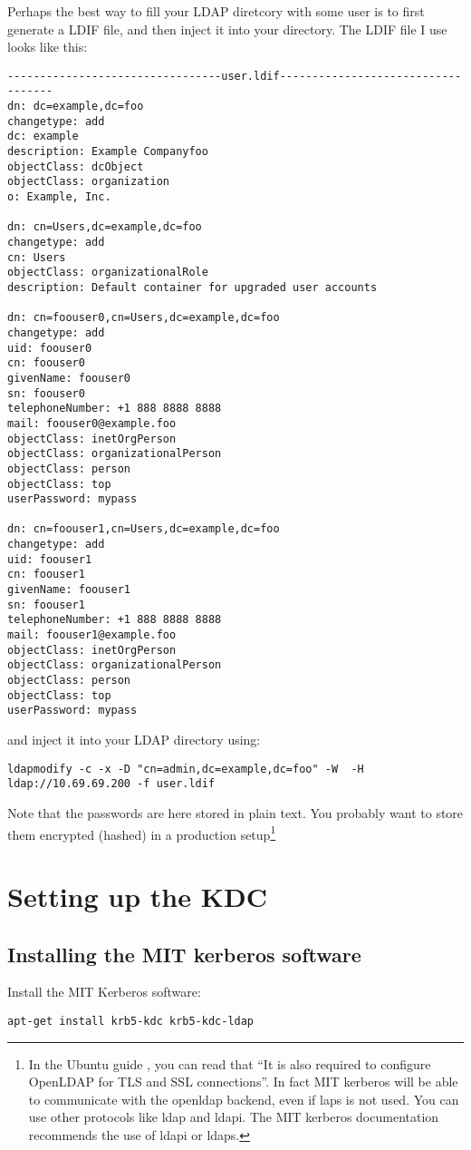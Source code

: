 \documentclass[12pt,a4]{article}
\begin{document}
Perhaps the best way to fill your LDAP diretcory with some user is to first generate a LDIF file, and then inject it into your directory.
The LDIF file I use looks like this:

\begin{verbatim}
---------------------------------user.ldif-----------------------------------
dn: dc=example,dc=foo
changetype: add
dc: example
description: Example Companyfoo
objectClass: dcObject
objectClass: organization
o: Example, Inc.

dn: cn=Users,dc=example,dc=foo
changetype: add
cn: Users
objectClass: organizationalRole
description: Default container for upgraded user accounts

dn: cn=foouser0,cn=Users,dc=example,dc=foo
changetype: add
uid: foouser0
cn: foouser0
givenName: foouser0
sn: foouser0
telephoneNumber: +1 888 8888 8888
mail: foouser0@example.foo
objectClass: inetOrgPerson
objectClass: organizationalPerson
objectClass: person
objectClass: top
userPassword: mypass

dn: cn=foouser1,cn=Users,dc=example,dc=foo
changetype: add
uid: foouser1
cn: foouser1
givenName: foouser1
sn: foouser1
telephoneNumber: +1 888 8888 8888
mail: foouser1@example.foo
objectClass: inetOrgPerson
objectClass: organizationalPerson
objectClass: person
objectClass: top
userPassword: mypass
\end{verbatim}

and inject it into your LDAP directory using:

\begin{verbatim}
ldapmodify -c -x -D "cn=admin,dc=example,dc=foo" -W  -H ldap://10.69.69.200 -f user.ldif
\end{verbatim}

Note that the passwords are here stored in plain text. You probably want to store them encrypted (hashed) in a production setup\footnote{In the Ubuntu guide \cite{ubuntu1}, you can read that ``It is also required to configure OpenLDAP for TLS and SSL connections''.
In fact MIT kerberos will be able to communicate with the openldap backend, even if laps is not used. You can use other protocols like ldap and ldapi.
The MIT kerberos documentation recommends the use of ldapi or ldaps.}

\section{Setting up the KDC}
\subsection{Installing the MIT kerberos software}
Install the MIT Kerberos software:
\begin{verbatim}
apt-get install krb5-kdc krb5-kdc-ldap
\end{verbatim}
\end{document}
